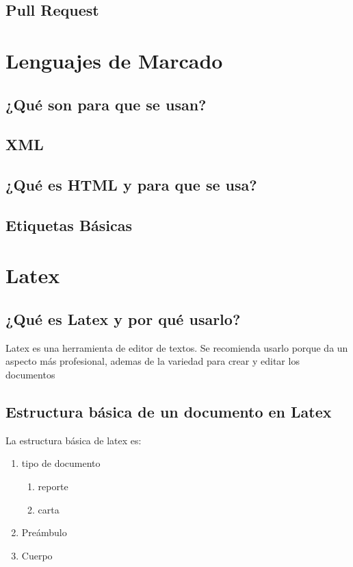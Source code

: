 \documentclass[11pt,letterpaper]{article}
\begin{document}
\subsection{Pull Request}
\section{Lenguajes de Marcado}
\subsection{¿Qué son para que se usan?}
\subsection{XML}
\subsection{¿Qué es HTML y para que se usa?}
\subsection{Etiquetas Básicas}
\section{Latex}
\subsection{¿Qué es Latex y por qué usarlo?}
Latex es una herramienta de editor de textos. Se recomienda usarlo porque da un aspecto más profesional, ademas de la variedad para crear y editar los documentos
\subsection{Estructura básica de un documento en Latex}
La estructura básica de latex es:
\begin{enumerate}
\item tipo de documento
  \begin{enumerate}
  \item reporte
  \item carta
  \end{enumerate}
\item Preámbulo
\item Cuerpo
\end{enumerate}

\end{document}
